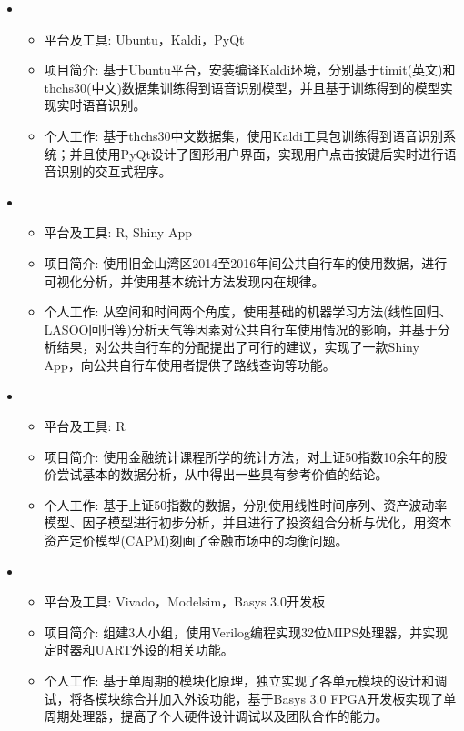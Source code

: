 \begin{itemize}[leftmargin=*]
    \item {}
    {\small
    \begin{itemize}
      \item 平台及工具: Ubuntu，Kaldi，PyQt
      \item 项目简介: 基于Ubuntu平台，安装编译Kaldi环境，分别基于timit(英文)和thchs30(中文)数据集训练得到语音识别模型，并且基于训练得到的模型实现实时语音识别。
      \item 个人工作: 基于thchs30中文数据集，使用Kaldi工具包训练得到语音识别系统；并且使用PyQt设计了图形用户界面，实现用户点击按键后实时进行语音识别的交互式程序。
    \end{itemize}
    }

    \item {}
	  {\small
	  \begin{itemize}
	    \item 平台及工具: R, Shiny App
	    \item 项目简介: 使用旧金山湾区2014至2016年间公共自行车的使用数据，进行可视化分析，并使用基本统计方法发现内在规律。
	    \item 个人工作: 从空间和时间两个角度，使用基础的机器学习方法(线性回归、LASOO回归等)分析天气等因素对公共自行车使用情况的影响，并基于分析结果，对公共自行车的分配提出了可行的建议，实现了一款Shiny App，向公共自行车使用者提供了路线查询等功能。
	  \end{itemize}
	  }
    \item {}
    {\small
    \begin{itemize}
      \item 平台及工具: R
      \item 项目简介: 使用金融统计课程所学的统计方法，对上证50指数10余年的股价尝试基本的数据分析，从中得出一些具有参考价值的结论。
      \item 个人工作: 基于上证50指数的数据，分别使用线性时间序列、资产波动率模型、因子模型进行初步分析，并且进行了投资组合分析与优化，用资本资产定价模型(CAPM)刻画了金融市场中的均衡问题。
    \end{itemize}
    }
        \item {}
    {\small
    \begin{itemize}
      \item 平台及工具: Vivado，Modelsim，Basys 3.0开发板
      \item 项目简介: 组建3人小组，使用Verilog编程实现32位MIPS处理器，并实现定时器和UART外设的相关功能。
      \item 个人工作: 基于单周期的模块化原理，独立实现了各单元模块的设计和调试，将各模块综合并加入外设功能，基于Basys 3.0 FPGA开发板实现了单周期处理器，提高了个人硬件设计调试以及团队合作的能力。
    \end{itemize}
    }
  \end{itemize}